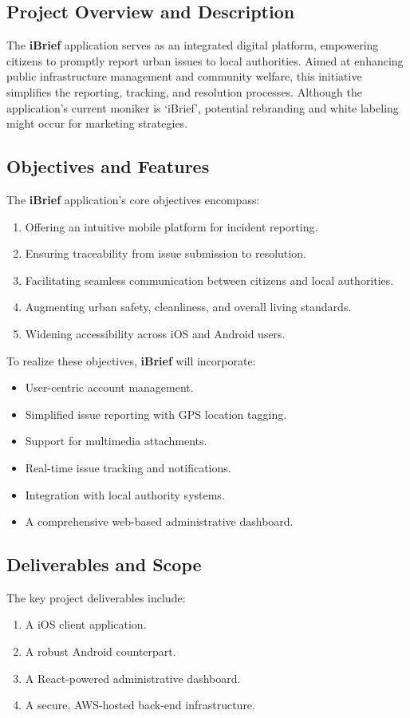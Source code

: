 \subsection{Project Overview and Description}
    The \textbf{iBrief} application serves as an integrated digital platform, empowering citizens to promptly report urban issues to local authorities. Aimed at enhancing public infrastructure management and community welfare, this initiative simplifies the reporting, tracking, and resolution processes. Although the application's current moniker is `iBrief', potential rebranding and white labeling might occur for marketing strategies. 

\subsection{Objectives and Features}
    The \textbf{iBrief} application's core objectives encompass:
    \begin{enumerate}[label=\alph*)]
        \item Offering an intuitive mobile platform for incident reporting.
        \item Ensuring traceability from issue submission to resolution.
        \item Facilitating seamless communication between citizens and local authorities.
        \item Augmenting urban safety, cleanliness, and overall living standards.
        \item Widening accessibility across iOS and Android users.
    \end{enumerate}

    To realize these objectives, \textbf{iBrief} will incorporate:
    \begin{itemize}
        \item User-centric account management.
        \item Simplified issue reporting with \gls{GPS} location tagging.
        \item Support for multimedia attachments.
        \item Real-time issue tracking and notifications.
        \item Integration with local authority systems.
        \item A comprehensive \gls{web-based} administrative dashboard.
    \end{itemize}

\subsection{Deliverables and Scope}
    The key project deliverables include:
    \begin{enumerate}
        \item A \gls{iOS} \gls{client application}.
        \item A robust \gls{Android} counterpart.
        \item A \gls{React}-powered administrative dashboard.
        \item A secure, \gls{AWS}-hosted back-end infrastructure.
    \end{enumerate}
    
